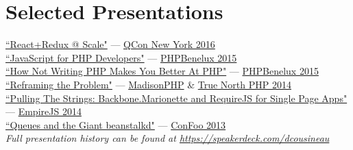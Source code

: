 \documentclass{resume}
\begin{document}
%

\section{Selected Presentations}

\begin{spacing}{1.25}
\href{https://speakerdeck.com/dcousineau/react-plus-redux-at-scale}{``React+Redux @ Scale"} --- \href{https://qconnewyork.com/ny2017/presentation/reactredux-scale-talk}{QCon New York 2016}\\
\href{https://speakerdeck.com/dcousineau/javascript-for-php-developers}{``JavaScript for PHP Developers"} --- \href{https://conference.phpbenelux.eu/2015/}{PHPBenelux 2015}\\
\href{https://speakerdeck.com/dcousineau/how-not-writing-php-makes-you-better-at-php}{``How Not Writing PHP Makes You Better At PHP"} --- \href{https://conference.phpbenelux.eu/2015/}{PHPBenelux 2015}\\
\href{https://speakerdeck.com/dcousineau/reframing-the-problem-truenorthphp-2014}{``Reframing the Problem"} --- \href{http://2014.madisonphpconference.com/schedule/view/19/reframing-the-problem-daniel-cousineau}{MadisonPHP} \& \href{http://truenorthphp.ca/}{True North PHP 2014}\\
\href{https://speakerdeck.com/dcousineau/pulling-the-strings-backbone-dot-marionette-and-require-dot-js-for-single-page-apps}{``Pulling The Strings: Backbone.Marionette and RequireJS for Single Page Apps"} --- \href{http://2014.empirejs.org/#/speakers}{EmpireJS 2014}\\
\href{https://speakerdeck.com/dcousineau/queues-and-the-giant-beanstalkd}{``Queues and the Giant beanstalkd"} --- \href{http://confoo.ca/}{ConFoo 2013}\\
\emph{Full presentation history can be found at \href{https://speakerdeck.com/dcousineau}{https://speakerdeck.com/dcousineau}}
\end{spacing}
\end{document}
